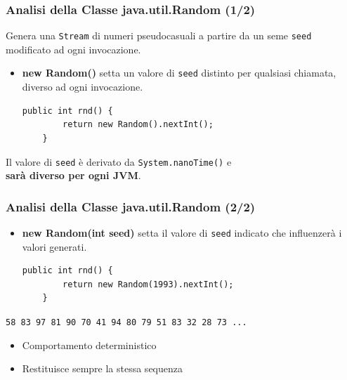 \documentclass[]{beamer}
\begin{document}
\begin{frame}[fragile]
\frametitle{Analisi della Classe java.util.Random (1/2)}
Genera una \lstinline|Stream| di numeri pseudocasuali a partire da un seme \lstinline|seed| modificato ad ogni invocazione.
\begin{block}{}
	\begin{itemize}
		\item \textbf{new Random()} setta un valore di \lstinline|seed| distinto per qualsiasi chiamata, diverso ad ogni invocazione.
		\begin{lstlisting}[breaklines=true]
	public int rnd() {
		return new Random().nextInt();
	}
		\end{lstlisting}
	\end{itemize}
\end{block}
\begin{center}
	Il valore di \lstinline|seed| è derivato da \lstinline|System.nanoTime()| e\\\textbf{sarà diverso per ogni JVM}.
\end{center}
\end{frame}

\begin{frame}[fragile]
\frametitle{Analisi della Classe java.util.Random (2/2)}
\begin{block}{}
	\begin{itemize}
		\item \textbf{new Random(int seed)} setta il valore di \lstinline|seed| indicato che influenzerà i valori generati.
		\begin{lstlisting}[breaklines=true]
	public int rnd() {
		return new Random(1993).nextInt();
	}
		\end{lstlisting}
	\end{itemize}
\end{block}
\begin{center}
	\lstinline|58 83 97 81 90 70 41 94 80 79 51 83 32 28 73 ...|
\end{center}
\begin{itemize}
	\item Comportamento deterministico
	\item Restituisce sempre la stessa sequenza
\end{itemize}
\end{frame}
\end{document}
